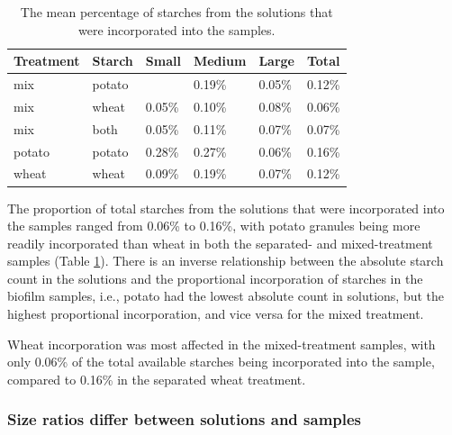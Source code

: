 \documentclass[
]{article}
\begin{document}
\begin{table}

\caption{\label{tab:sample-prop-tbl}The mean percentage of starches from the solutions that 
              were incorporated into the samples.}
\centering
\begin{tabular}[t]{l|l|l|l|l|l}
\hline
Treatment & Starch & Small & Medium & Large & Total\\
\hline
mix & potato &  & 0.19\% & 0.05\% & 0.12\%\\
\hline
mix & wheat & 0.05\% & 0.10\% & 0.08\% & 0.06\%\\
\hline
mix & both & 0.05\% & 0.11\% & 0.07\% & 0.07\%\\
\hline
potato & potato & 0.28\% & 0.27\% & 0.06\% & 0.16\%\\
\hline
wheat & wheat & 0.09\% & 0.19\% & 0.07\% & 0.12\%\\
\hline
\end{tabular}
\end{table}

The proportion of total starches from the solutions that were incorporated
into the samples ranged from
0.06\% to 0.16\%,
with potato granules being more readily incorporated than wheat in both the
separated- and mixed-treatment samples
(Table \ref{tab:sample-prop-tbl}).
There is an inverse relationship between the absolute starch count in the solutions
and the proportional incorporation of starches in the biofilm samples, i.e., potato
had the lowest absolute count in solutions, but the highest proportional
incorporation, and vice versa for the mixed treatment.

Wheat incorporation was most affected in the mixed-treatment samples, with only
0.06\% of the total available starches being incorporated into
the sample, compared to
0.16\%
in the separated wheat treatment.

\hypertarget{size-ratios-differ-between-solutions-and-samples}{%
\subsubsection{Size ratios differ between solutions and samples}\label{size-ratios-differ-between-solutions-and-samples}}
\end{document}
